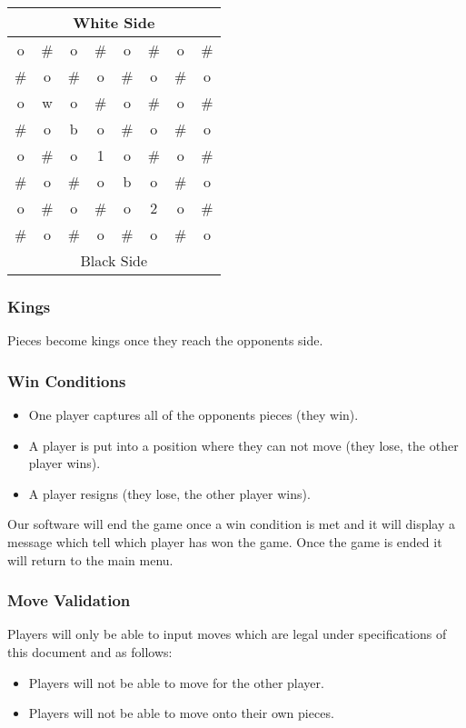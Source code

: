 \noindent
\begin{tabular}{|c|c|c|c|c|c|c|c|}
  \hline
  \multicolumn{8}{|c|}{White Side}  \\ \hline
  o & \# & o & \# & o & \# & o & \# \\ \hline
  \# & o & \# & o & \# & o & \# & o \\ \hline
  o & w & o & \# & o & \# & o & \# \\ \hline
  \# & o & b & o & \# & o & \# & o \\ \hline
  o & \# & o & 1 & o & \# & o & \# \\ \hline
  \# & o & \# & o & b & o & \# & o \\ \hline
  o & \# & o & \# & o & 2 & o & \# \\ \hline
  \# & o & \# & o & \# & o & \# & o \\ \hline
  \multicolumn{8}{|c|}{Black Side}  \\ \hline
\end{tabular}

\subsubsection{Kings}
Pieces become kings once they reach the opponents side.

\subsubsection{Win Conditions}
\begin{itemize}
  \item One player captures all of the opponents pieces (they win).
  \item A player is put into a position where they can not move (they lose, the
    other player wins).
  \item A player resigns (they lose, the other player wins).
\end{itemize}
Our software will end the game once a win condition is met and it will
display a message which tell which player has won the game. Once the
game is ended it will return to the main menu.

\subsubsection{Move Validation}
Players will only be able to input moves which are legal under specifications
of this document and as follows:
\begin{itemize}
  \item Players will not be able to move for the other player.
  \item Players will not be able to move onto their own pieces.
\end{itemize}

